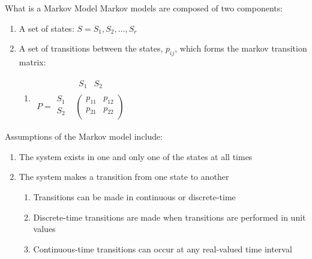 \documentclass[
  ignorenonframetext,
]{beamer}
\providecommand{\tightlist}{%
  \setlength{\itemsep}{0pt}\setlength{\parskip}{0pt}}
\begin{document}
\begin{frame}{What is a Markov Model}
\label{what-is-a-markov-model}
Markov models are composed of two components:

\begin{enumerate}
\item
  A set of states: \(S={S_1, S_2, ..., S_r}\)
\item
  A set of transitions between the states, \(p_{ij}\), which forms the
  markov transition matrix:

  \begin{enumerate}
  \tightlist
  \item
    \(\begin{array}{ccc} &\begin{array}{cccc} S_{1} & S_{2}\end{array}\\P=\begin{array}{cccc}S_{1} \\S_{2} \\\end{array}&\left(\begin{array}{cccc}p_{11} & p_{12}  \\p_{21} & p_{22}  \\\end{array}\right)\end{array}\)
  \end{enumerate}
\end{enumerate}

Assumptions of the Markov model include:

\begin{enumerate}
\item
  The system exists in one and only one of the states at all times
\item
  The system makes a transition from one state to another

  \begin{enumerate}
  \item
    Transitions can be made in continuous or discrete-time
  \item
    Discrete-time transitions are made when transitions are performed in
    unit values
  \item
    Continuous-time transitions can occur at any real-valued time
    interval
  \end{enumerate}
\end{enumerate}
\end{frame}
\end{document}
